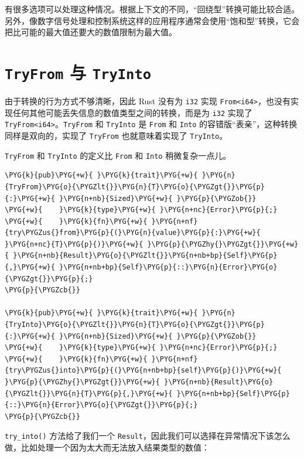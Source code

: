 有很多选项可以处理这种情况。根据上下文的不同，“回绕型”转换可能比较合适。另外，像数字信号处理和控制系统这样的应用程序通常会使用“饱和型”转换，它会把比可能的最大值还要大的数值限制为最大值。

\section{\texttt{TryFrom} 与 \texttt{TryInto}}

由于转换的行为方式不够清晰，因此 Rust 没有为 \texttt{i32} 实现 \texttt{From<i64>}，也没有实现任何其他可能丢失信息的数值类型之间的转换，而是为 \texttt{i32} 实现了 \texttt{TryFrom<i64>}。\texttt{TryFrom} 和 \texttt{TryInto} 是 \texttt{From} 和 \texttt{Into} 的容错版“表亲”，这种转换同样是双向的，实现了 \texttt{TryFrom} 也就意味着实现了 \texttt{TryInto}。

\texttt{TryFrom} 和 \texttt{TryInto} 的定义比 \texttt{From} 和 \texttt{Into} 稍微复杂一点儿。

\begin{Verbatim}[commandchars=\\\{\},breaklines=true,breakanywhere=true,fontsize=\codefont,xleftmargin=17bp]
\PYG{k}{pub}\PYG{+w}{ }\PYG{k}{trait}\PYG{+w}{ }\PYG{n}{TryFrom}\PYG{o}{\PYGZlt{}}\PYG{n}{T}\PYG{o}{\PYGZgt{}}\PYG{p}{:}\PYG{+w}{ }\PYG{n+nb}{Sized}\PYG{+w}{ }\PYG{p}{\PYGZob{}}
\PYG{+w}{    }\PYG{k}{type}\PYG{+w}{ }\PYG{n+nc}{Error}\PYG{p}{;}
\PYG{+w}{    }\PYG{k}{fn}\PYG{+w}{ }\PYG{n+nf}{try\PYGZus{}from}\PYG{p}{(}\PYG{n}{value}\PYG{p}{:}\PYG{+w}{ }\PYG{n+nc}{T}\PYG{p}{)}\PYG{+w}{ }\PYG{p}{\PYGZhy{}\PYGZgt{}}\PYG{+w}{ }\PYG{n+nb}{Result}\PYG{o}{\PYGZlt{}}\PYG{n+nb+bp}{Self}\PYG{p}{,}\PYG{+w}{ }\PYG{n+nb+bp}{Self}\PYG{p}{::}\PYG{n}{Error}\PYG{o}{\PYGZgt{}}\PYG{p}{;}
\PYG{p}{\PYGZcb{}}

\PYG{k}{pub}\PYG{+w}{ }\PYG{k}{trait}\PYG{+w}{ }\PYG{n}{TryInto}\PYG{o}{\PYGZlt{}}\PYG{n}{T}\PYG{o}{\PYGZgt{}}\PYG{p}{:}\PYG{+w}{ }\PYG{n+nb}{Sized}\PYG{+w}{ }\PYG{p}{\PYGZob{}}
\PYG{+w}{    }\PYG{k}{type}\PYG{+w}{ }\PYG{n+nc}{Error}\PYG{p}{;}
\PYG{+w}{    }\PYG{k}{fn}\PYG{+w}{ }\PYG{n+nf}{try\PYGZus{}into}\PYG{p}{(}\PYG{n+nb+bp}{self}\PYG{p}{)}\PYG{+w}{ }\PYG{p}{\PYGZhy{}\PYGZgt{}}\PYG{+w}{ }\PYG{n+nb}{Result}\PYG{o}{\PYGZlt{}}\PYG{n}{T}\PYG{p}{,}\PYG{+w}{ }\PYG{n+nb+bp}{Self}\PYG{p}{::}\PYG{n}{Error}\PYG{o}{\PYGZgt{}}\PYG{p}{;}
\PYG{p}{\PYGZcb{}}
\end{Verbatim}

\texttt{try\_into()} 方法给了我们一个 \texttt{Result}，因此我们可以选择在异常情况下该怎么做，比如处理一个因为太大而无法放入结果类型的数值：

